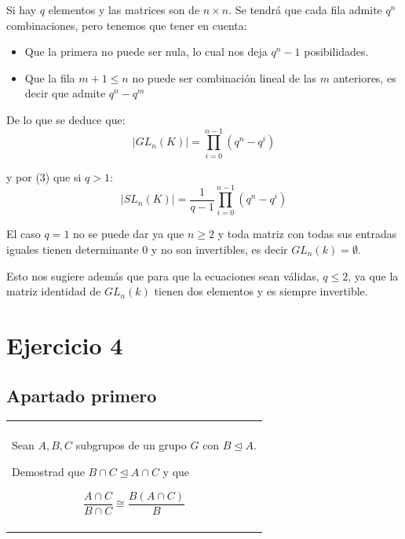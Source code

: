 \documentclass[12pt]{article}
\newenvironment{micaja}
{
    \begin{center}
    \begin{tabular}{|p{0.9\textwidth}|}
    \hline\\
    }   
    {   
    \\\\\hline
    \end{tabular} 
    \end{center}
    }
\begin{document}
Si hay $q$ elementos y las matrices son de $n \times n.$
Se tendrá que cada fila admite $q^n$ combinaciones, pero tenemos que tener en cuenta:
\begin{itemize}
    \item Que la primera no puede ser nula, lo cual nos deja $q^n -1$ posibilidades.
    \item Que la fila $m+1 \leq n$ no puede ser combinación lineal de las $m$ anteriores, 
    es decir que admite $q^{n}-q^{m}$
\end{itemize}

De lo que se deduce que: 
\begin{equation*}
    |GL_n(K)| = \prod_{i=0}^{n-1} (q^n - q^i)
\end{equation*}

y por (3) que si $q>1$:
\begin{equation*}
    |SL_n(K)| = \frac{1}{q-1}\prod_{i=0}^{n-1} (q^n - q^i)
\end{equation*}

El caso $q = 1$ no se puede dar ya que $n \geq 2$ y toda matriz con todas sus entradas iguales
tienen determinante 0 y no son invertibles, es decir $GL_n(k) = \emptyset.$

Esto nos sugiere además que para que la ecuaciones sean válidas, $q \leq 2$, ya que la matriz
identidad de $GL_n(k)$ tienen dos elementos y es siempre invertible. 



\newpage

\section{Ejercicio 4}

\subsection{Apartado primero}

\begin{micaja}
    Sean $A,B,C$ subgrupos de un grupo $G$ con $B \trianglelefteq A.$

    Demostrad que $B \cap C \trianglelefteq A  \cap C$ y que 

    \begin{equation*}
        \frac{A \cap C}{B \cap C} \cong \frac{B(A \cap C)}{B}
    \end{equation*}
   
\end{micaja}
\end{document}
